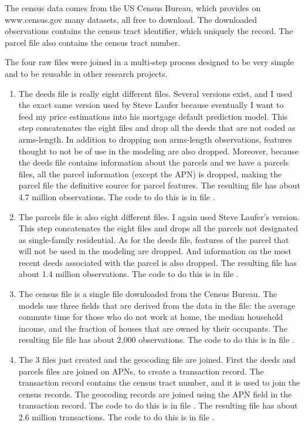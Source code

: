 The census data comes from the US Census Bureau, which provides on
www.census.gov many datasets, all free to download. The downloaded
observations contains the census tract identifier, which uniquely
the record. The parcel file also contains the census tract number.

The four raw files were joined in a multi-step process designed to be
very simple and to be reusable in other research projects.
\begin{enumerate}

\item The deeds file is really eight different files. Several versions
  exist, and I used the exact same version used by Steve Laufer
  because eventually I want to feed my price estimations into his
  mortgage default prediction model. This step concatenates the eight
  files and drop all the deeds that are not coded as arms-length. In
  addition to dropping non arms-length observations, features thought
  to not be of use in the modeling are also dropped. Moreover, because
  the deeds file contains information about the parcels and we have a
  parcels files, all the parcel information (except the APN) is
  dropped, making the parcel file the definitive source for parcel
  features. The resulting file  has about 4.7
  million observations. The code to do this is in file .

\item The parcels file is also eight different files. I again used
  Steve Laufer's version. This step concatenates the eight files and
  drops all the parcels not designated as single-family
  residential. As for the deeds file, features of the parcel that will
  not be used in the modeling are dropped. And information on the most
  recent deeds associated with the parcel is also dropped. The
  resulting file  has about 1.4 million
  observations. The code to do this is in file .

\item The census file is a single file downloaded from the Census
  Bureau. The models use three fields that are derived from the data
  in the file: the average commute time for those who do not work at
  home, the median household income, and the fraction of houses that
  are owned by their occupants. The resulting file 
  file has about 2,000 observations. The code to do this is in file
  .

\item The 3 files just created and the geocoding file are
  joined. First the deeds and parcels files are joined on APNs, to
  create a transaction record. The transaction record contains the
  census tract number, and it is used to join the census records. The
  geocoding records are joined using the APN field in the transaction
  record. The code to do this is in file
  . The resulting file
   has about 2.6 million
  transactions. The code to do this is in file
  .


\end{enumerate}
